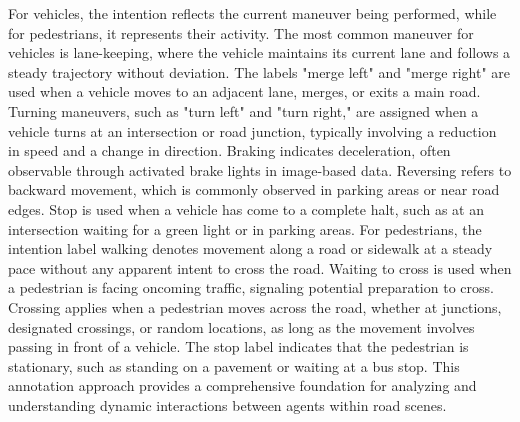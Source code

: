 For vehicles, the intention reflects the current maneuver being performed, while for pedestrians, it represents their activity. The most common maneuver for vehicles is lane-keeping, where the vehicle maintains its current lane and follows a steady trajectory without deviation. The labels "merge left" and "merge right" are used when a vehicle moves to an adjacent lane, merges, or exits a main road. Turning maneuvers, such as "turn left" and "turn right," are assigned when a vehicle turns at an intersection or road junction, typically involving a reduction in speed and a change in direction. Braking indicates deceleration, often observable through activated brake lights in image-based data. Reversing refers to backward movement, which is commonly observed in parking areas or near road edges. Stop is used when a vehicle has come to a complete halt, such as at an intersection waiting for a green light or in parking areas. For pedestrians, the intention label walking denotes movement along a road or sidewalk at a steady pace without any apparent intent to cross the road. Waiting to cross is used when a pedestrian is facing oncoming traffic, signaling potential preparation to cross. Crossing applies when a pedestrian moves across the road, whether at junctions, designated crossings, or random locations, as long as the movement involves passing in front of a vehicle. The stop label indicates that the pedestrian is stationary, such as standing on a pavement or waiting at a bus stop. This annotation approach provides a comprehensive foundation for analyzing and understanding dynamic interactions between agents within road scenes.

